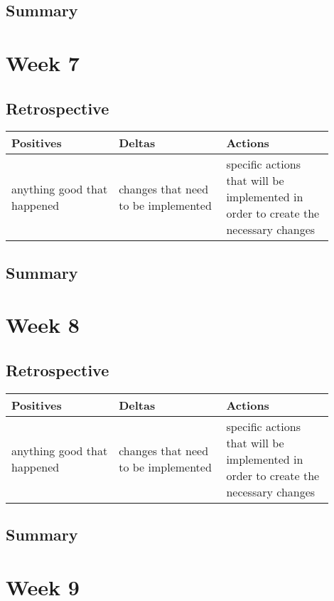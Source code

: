 \documentclass[letterpaper,10pt,serif,draftclsnofoot,onecolumn,compsoc,titlepage]{IEEEtran}
\begin{document}
\subsection{Summary}

\section{Week 7}
\subsection{Retrospective}


\begin{tabular}{|p{0.3\linewidth}|p{0.3\linewidth}|p{0.3\linewidth}|}
   \hline
   \textbf{Positives} & \textbf{Deltas} & \textbf{Actions}\\ 
   \hline
   anything good that happened & changes that need to be implemented & specific actions that will be implemented in order to create the necessary changes \\
   \hline
\end{tabular}

\subsection{Summary}

\section{Week 8}
\subsection{Retrospective}


\begin{tabular}{|p{0.3\linewidth}|p{0.3\linewidth}|p{0.3\linewidth}|}
   \hline
   \textbf{Positives} & \textbf{Deltas} & \textbf{Actions}\\ 
   \hline
   anything good that happened & changes that need to be implemented & specific actions that will be implemented in order to create the necessary changes \\
   \hline
\end{tabular}

\subsection{Summary}

\section{Week 9}
\end{document}
